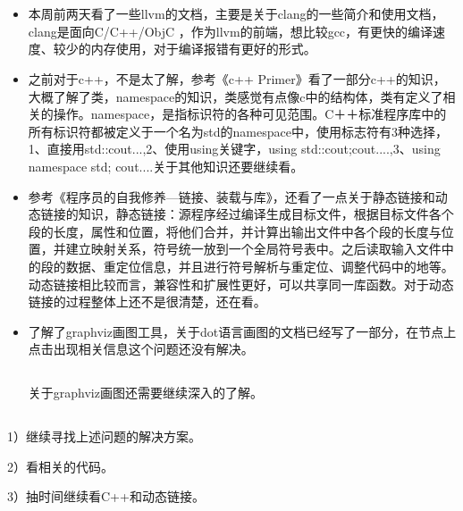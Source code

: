 \section{}

\subsection{}
\begin{itemize}
\item{本周前两天看了一些llvm的文档，主要是关于clang的一些简介和使用文档，clang是面向C/C++/ObjC ，作为llvm的前端，想比较gcc，有更快的编译速度、较少的内存使用，对于编译报错有更好的形式。}
\item{之前对于c++，不是太了解，参考《c++ Primer》看了一部分c++的知识，大概了解了类，namespace的知识，类感觉有点像c中的结构体，类有定义了相关的操作。namespace，是指标识符的各种可见范围。C＋＋标准程序库中的所有标识符都被定义于一个名为std的namespace中，使用标志符有3种选择，1、直接用std::cout...,2、使用using关键字，using std::cout;cout....,3、using namespace std; cout....关于其他知识还要继续看。}
\item{参考《程序员的自我修养—链接、装载与库》，还看了一点关于静态链接和动态链接的知识，静态链接：源程序经过编译生成目标文件，根据目标文件各个段的长度，属性和位置，将他们合并，并计算出输出文件中各个段的长度与位置，并建立映射关系，符号统一放到一个全局符号表中。之后读取输入文件中的段的数据、重定位信息，并且进行符号解析与重定位、调整代码中的地等。动态链接相比较而言，兼容性和扩展性更好，可以共享同一库函数。对于动态链接的过程整体上还不是很清楚，还在看。}
\item{了解了graphviz画图工具，关于dot语言画图的文档已经写了一部分，在节点上点击出现相关信息这个问题还没有解决。}
\subsection{}
关于graphviz画图还需要继续深入的了解。
\end{itemize}
\subsection{}
1）继续寻找上述问题的解决方案。


2）看相关的代码。


3）抽时间继续看C++和动态链接。

